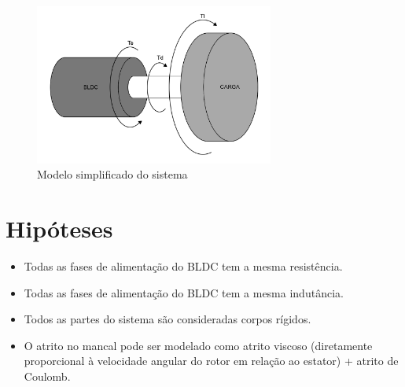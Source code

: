         \begin{figure}[ht]
            \centering
            \includegraphics[width=0.7\textwidth]{sketch_bldc}
            \caption{Modelo simplificado do sistema}
            \label{fig_modelo_simplificado}
        \end{figure}

    \section{Hipóteses}
        \begin{itemize}
            \item Todas as fases de alimentação do BLDC tem a mesma resistência.
            \item Todas as fases de alimentação do BLDC tem a mesma indutância.
            \item Todos as partes do sistema são consideradas corpos rígidos.
            \item O atrito no mancal pode ser modelado como atrito viscoso (diretamente proporcional à velocidade angular do rotor em relação ao estator) + atrito de Coulomb.
        \end{itemize}

